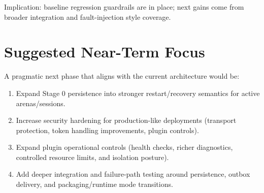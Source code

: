\documentclass[11pt]{article}
\begin{document}
Implication: baseline regression guardrails are in place; next gains come from broader integration and fault-injection style coverage.

\section{Suggested Near-Term Focus}
A pragmatic next phase that aligns with the current architecture would be:
\begin{enumerate}[leftmargin=*]
  \item Expand Stage 0 persistence into stronger restart/recovery semantics for active arenas/sessions.
  \item Increase security hardening for production-like deployments (transport protection, token handling improvements, plugin controls).
  \item Expand plugin operational controls (health checks, richer diagnostics, controlled resource limits, and isolation posture).
  \item Add deeper integration and failure-path testing around persistence, outbox delivery, and packaging/runtime mode transitions.
\end{enumerate}
\end{document}
